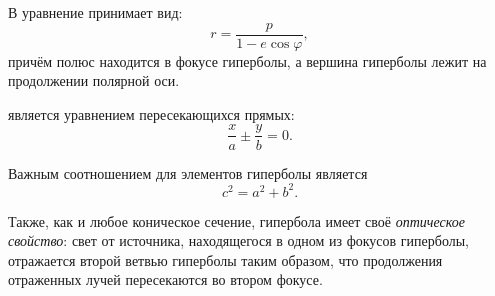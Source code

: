 В  уравнение принимает вид:
\begin{equation}
r=\frac{p}{1-e\cos\varphi},
\end{equation}
причём полюс находится в фокусе гиперболы, а вершина гиперболы лежит на продолжении полярной оси.

 является уравнением пересекающихся прямых:
\begin{equation}
	\frac{x}{a}\pm\frac{y}{b}=0.
\end{equation}

Важным соотношением для элементов гиперболы является
\begin{equation}
c^2=a^2+b^2.
\end{equation}

Также, как и любое коническое сечение, гипербола имеет своё {\itshape оптическое свойство}: свет от источника, находящегося в одном из фокусов гиперболы, отражается второй ветвью гиперболы таким образом, что продолжения отраженных лучей пересекаются во втором фокусе.

